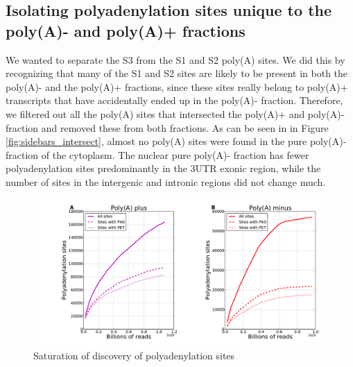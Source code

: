 \subsection{Isolating polyadenylation sites unique to the poly(A)- and poly(A)+
fractions}
We wanted to separate the S3 from the S1 and S2 poly(A) sites. We did this by
recognizing that many of the S1 and S2 sites are likely to be present in both
the poly(A)- and the poly(A)+ fractions, since these sites really belong to
poly(A)+ transcripts that have accidentally ended up in the poly(A)- fraction.
Therefore, we filtered out all the poly(A) sites that intersected the poly(A)+
and poly(A)- fraction and removed these from both fractions. As can be seen in
in Figure \ref{fig:sidebars_intersect}, almost no poly(A) sites were found in
the pure poly(A)- fraction of the cytoplasm. The nuclear pure poly(A)- fraction
has fewer polyadenylation sites predominantly in the 3UTR exonic region, while
the number of sites in the intergenic and intronic regions did not change much.

\begin{figure}[htb]
	\begin{center}
		\includegraphics[scale=0.3]{figures/polyadenylation/Saturation_plot_2+.pdf}
	\end{center}
	\caption{Saturation of discovery of polyadenylation sites}
	\label{fig:saturation}
\end{figure}


